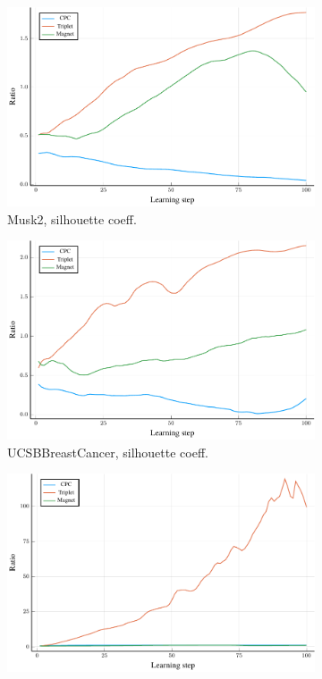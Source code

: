 \begin{figure}
  \centering
  \begin{subfigure}[t]{0.32\textwidth}
    \centering
    \includegraphics[width=\textwidth]{images/Musk2_ratio/Musk2_ratio.pdf}
    \caption{Musk2, silhouette coeff.}
  \end{subfigure}
  \begin{subfigure}[t]{0.32\textwidth}
    \centering
    \includegraphics[width=\textwidth]{images/UCSBBreastCancer_ratio/UCSBBreastCancer_ratio.pdf}
    \caption{UCSBBreastCancer, silhouette coeff.}
  \end{subfigure}
  \begin{subfigure}[t]{0.32\textwidth}
    \centering
    \includegraphics[width=\textwidth]{images/Web3_ratio/Web3_ratio.pdf}

\end{subfigure}
\end{figure}
